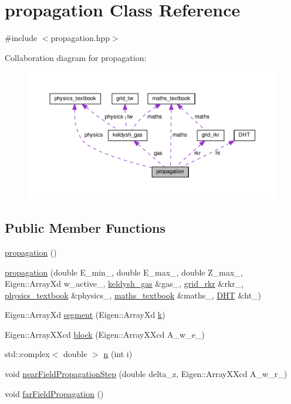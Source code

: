 \hypertarget{classpropagation}{}\section{propagation Class Reference}
\label{classpropagation}


{\ttfamily \#include $<$propagation.\+hpp$>$}



Collaboration diagram for propagation\+:\nopagebreak
\begin{figure}[H]
\begin{center}
\leavevmode
\includegraphics[width=350pt]{classpropagation__coll__graph}
\end{center}
\end{figure}
\subsection*{Public Member Functions}
\begin{DoxyCompactItemize}
\item 
\hyperlink{classpropagation_a9d7b9f42ce1c0bc741d3016a07ba13f7}{propagation} ()
\item 
\hyperlink{classpropagation_a082efa11767639ade0eaf0f8856cc410}{propagation} (double E\+\_\+min\+\_\+, double E\+\_\+max\+\_\+, double Z\+\_\+max\+\_\+, Eigen\+::\+Array\+Xd w\+\_\+active\+\_\+, \hyperlink{classkeldysh__gas}{keldysh\+\_\+gas} \&gas\+\_\+, \hyperlink{classgrid__rkr}{grid\+\_\+rkr} \&rkr\+\_\+, \hyperlink{classphysics__textbook}{physics\+\_\+textbook} \&physics\+\_\+, \hyperlink{classmaths__textbook}{maths\+\_\+textbook} \&maths\+\_\+, \hyperlink{class_d_h_t}{D\+HT} \&ht\+\_\+)
\item 
Eigen\+::\+Array\+Xd \hyperlink{classpropagation_a39126bbbd4977c140c0077b849e78bc1}{segment} (Eigen\+::\+Array\+Xd \hyperlink{classpropagation_a49a30e941421cd5e3f0b62bd1335a767}{k})
\item 
Eigen\+::\+Array\+X\+Xcd \hyperlink{classpropagation_af12b15d9b91f98516c0ff25efc1233d1}{block} (Eigen\+::\+Array\+X\+Xcd A\+\_\+w\+\_\+e\+\_\+)
\item 
std\+::complex$<$ double $>$ \hyperlink{classpropagation_a7c696d9e54e5f0a7735047e28aee4866}{n} (int i)
\item 
void \hyperlink{classpropagation_aedba6e1b78d23ae9f5f3f8b8cfd28c19}{near\+Field\+Propagation\+Step} (double delta\+\_\+z, Eigen\+::\+Array\+X\+Xcd A\+\_\+w\+\_\+r\+\_\+)
\item 
void \hyperlink{classpropagation_a9c2e1cb4e314c173b26de08ffcfe071d}{far\+Field\+Propagation} ()
\end{DoxyCompactItemize}

